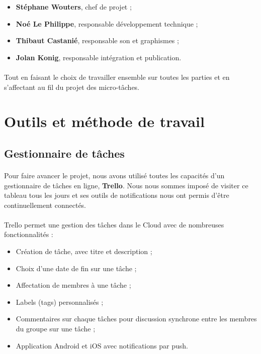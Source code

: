 \begin{itemize}
\item \textbf{Stéphane Wouters}, chef de projet ;
\item \textbf{Noé Le Philippe}, responsable développement technique ;
\item \textbf{Thibaut Castanié}, responsable son et graphismes ;
\item \textbf{Jolan Konig}, responsable intégration et publication.
\end{itemize}

\paragraph{}
Tout en faisant le choix de travailler ensemble sur toutes les parties et en s’affectant au fil du projet des micro-tâches.

\section{Outils et méthode de travail}

\subsection{Gestionnaire de tâches}

\paragraph{}
Pour faire avancer le projet, nous avons utilisé toutes les capacités d’un gestionnaire de tâches en ligne, \textbf{Trello}. Nous nous sommes imposé de visiter ce tableau tous les jours et ses outils de notifications nous ont permis d’être continuellement connectés.

\paragraph{}
Trello permet une gestion des tâches dans le Cloud avec de nombreuses fonctionnalités :
\begin{itemize}
\item Création de tâche, avec titre et description ;
\item Choix d’une date de fin sur une tâche ;
\item Affectation de membres à une tâche ;
\item Labels (tags) personnalisés ;
\item Commentaires sur chaque tâches pour discussion synchrone entre les membres du groupe sur une tâche ;
\item Application Android et iOS avec notifications par push.
\end{itemize}

